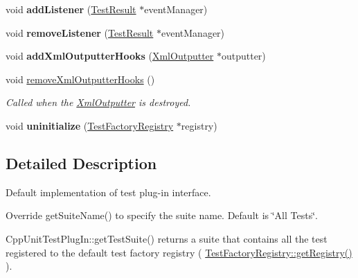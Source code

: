 \begin{DoxyCompactItemize}
\item 
\hypertarget{class_test_plug_in_default_impl_a0180a801dd78be5741a200e866684b20}{void {\bfseries add\+Listener} (\hyperlink{class_test_result}{Test\+Result} $\ast$event\+Manager)}\label{class_test_plug_in_default_impl_a0180a801dd78be5741a200e866684b20}

\item 
\hypertarget{class_test_plug_in_default_impl_a26364a3a81e48ff9adcef1a5cd3e40df}{void {\bfseries remove\+Listener} (\hyperlink{class_test_result}{Test\+Result} $\ast$event\+Manager)}\label{class_test_plug_in_default_impl_a26364a3a81e48ff9adcef1a5cd3e40df}

\item 
\hypertarget{class_test_plug_in_default_impl_aed4c5b89adaa0bb0b4f11cc4aca782a2}{void {\bfseries add\+Xml\+Outputter\+Hooks} (\hyperlink{class_xml_outputter}{Xml\+Outputter} $\ast$outputter)}\label{class_test_plug_in_default_impl_aed4c5b89adaa0bb0b4f11cc4aca782a2}

\item 
void \hyperlink{class_test_plug_in_default_impl_aa4fa891e799ff362dece734417afd93d}{remove\+Xml\+Outputter\+Hooks} ()
\begin{DoxyCompactList}\small\item\em Called when the \hyperlink{class_xml_outputter}{Xml\+Outputter} is destroyed. \end{DoxyCompactList}\item 
\hypertarget{class_test_plug_in_default_impl_aab567f339bbda38e759b7bd631ad8b8c}{void {\bfseries uninitialize} (\hyperlink{class_test_factory_registry}{Test\+Factory\+Registry} $\ast$registry)}\label{class_test_plug_in_default_impl_aab567f339bbda38e759b7bd631ad8b8c}

\end{DoxyCompactItemize}


\subsection{Detailed Description}
Default implementation of test plug-\/in interface.

Override get\+Suite\+Name() to specify the suite name. Default is \char`\"{}\+All Tests\char`\"{}. 

Cpp\+Unit\+Test\+Plug\+In\+::get\+Test\+Suite() returns a suite that contains all the test registered to the default test factory registry ( \hyperlink{class_test_factory_registry_ac153260dae65c3e6e8ebc33ecde04ccb}{Test\+Factory\+Registry\+::get\+Registry()} ). 

